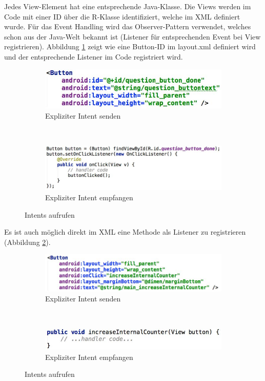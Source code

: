 Jedes View-Element hat eine entsprechende Java-Klasse. Die Views werden im Code mit einer ID über die R-Klasse identifiziert, welche im XML definiert wurde. Für das Event Handling wird das Observer-Pattern verwendet, welches schon aus der Java-Welt bekannt ist (Listener für entsprechenden Event bei View registrieren). Abbildung \ref{fig:event-java} zeigt wie eine Button-ID im layout.xml definiert wird und der entsprechende Listener im Code registriert wird.
\begin{figure}
	\centering
	\begin{subfigure}[b]{0.4\textwidth}
		\includegraphics[width=\textwidth]{fig/event-java-id}
		\caption{Expliziter Intent senden}
	\end{subfigure}
	~
	\begin{subfigure}[b]{0.4\textwidth}
		\includegraphics[width=\textwidth]{fig/event-java-listener}
		\caption{Expliziter Intent empfangen}
	\end{subfigure}
	\caption{Intents aufrufen}
	\label{fig:event-java}
\end{figure}
Es ist auch möglich direkt im XML eine Methode als Listener zu registrieren (Abbildung \ref{fig:event-xml}).
\begin{figure}
	\centering
	\begin{subfigure}[b]{0.4\textwidth}
		\includegraphics[width=\textwidth]{fig/event-xml-onclick}
		\caption{Expliziter Intent senden}
	\end{subfigure}
	~
	\begin{subfigure}[b]{0.4\textwidth}
		\includegraphics[width=\textwidth]{fig/event-xml-method}
		\caption{Expliziter Intent empfangen}
	\end{subfigure}
	\caption{Intents aufrufen}
	\label{fig:event-xml}
\end{figure}

